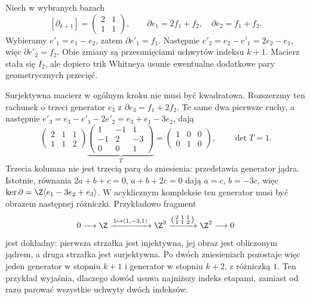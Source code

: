 \begin{przyklad}
Niech w wybranych bazach
\[
 [\partial_{k+1}]
 =\begin{pmatrix}2&1\\1&1\end{pmatrix},
 \qquad
 \partial e_1=2f_1+f_2,\quad
 \partial e_2=f_1+f_2.
\]
Wybieramy
$e'_1=e_1-e_2$, zatem
$\partial e'_1=f_1$.
Następnie
$e'_2=e_2-e'_1=2e_2-e_1$,
więc $\partial e'_2=f_2$.
Obie zmiany są przesunięciami
uchwytów indeksu $k+1$.
Macierz stała się $I_2$,
ale dopiero trik Whitneya
usunie ewentualne
dodatkowe pary
geometrycznych przecięć.

Surjektywna macierz w ogólnym kroku nie musi być kwadratowa.
Rozszerzmy ten rachunek o trzeci generator $e_3$ z
$\partial e_3=f_1+2f_2$. Te same dwa pierwsze ruchy,
a następnie $e'_3=e_3-e'_1-2e'_2=e_3+e_1-3e_2$, dają
\[
 \begin{pmatrix}2&1&1\\1&1&2\end{pmatrix}
 \underbrace{\begin{pmatrix}1&-1&1\\-1&2&-3\\0&0&1\end{pmatrix}}_{T}
 =\begin{pmatrix}1&0&0\\0&1&0\end{pmatrix},\qquad \det T=1.
\]
Trzecia kolumna nie jest trzecią parą do zniesienia:
przedstawia generator jądra. Istotnie, równania
$2a+b+c=0$, $a+b+2c=0$ dają $a=c$, $b=-3c$,
więc $\ker\partial=\Z\langle e_1-3e_2+e_3\rangle$.
W acyklicznym kompleksie ten generator musi być obrazem
następnej różniczki. Przykładowo fragment
\[
 0\longrightarrow\Z
 \xrightarrow{\,1\mapsto(1,-3,1)\,}\Z^3
 \xrightarrow{\left(\begin{smallmatrix}2&1&1\\1&1&2\end{smallmatrix}\right)}
 \Z^2\longrightarrow0
\]
jest dokładny: pierwsza strzałka jest injektywna, jej obraz
jest obliczonym jądrem, a druga strzałka jest surjektywna.
Po dwóch zniesieniach pozostaje więc jeden generator w stopniu
$k+1$ i generator w stopniu $k+2$, z różniczką $1$.
Ten przykład wyjaśnia, dlaczego dowód usuwa najniższy indeks
etapami, zamiast od razu parować wszystkie uchwyty dwóch indeksów.
\end{przyklad}


